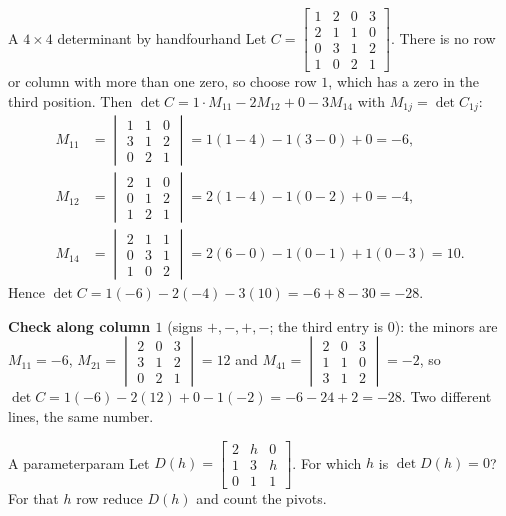 \documentclass[11pt]{article}
\begin{document}
\begin{exmp}{A $4\times4$ determinant by hand}{fourhand}
Let $C=\begin{bmatrix}1&2&0&3\\2&1&1&0\\0&3&1&2\\1&0&2&1\end{bmatrix}$. There is no row or column with more than one zero, so choose row $1$, which has a zero in the third position. Then $\det C=1\cdot M_{11}-2M_{12}+0-3M_{14}$ with $M_{1j}=\det C_{1j}$:
\begin{align*}
M_{11}&=\begin{vmatrix}1&1&0\\3&1&2\\0&2&1\end{vmatrix}=1(1-4)-1(3-0)+0=-6,\\
M_{12}&=\begin{vmatrix}2&1&0\\0&1&2\\1&2&1\end{vmatrix}=2(1-4)-1(0-2)+0=-4,\\
M_{14}&=\begin{vmatrix}2&1&1\\0&3&1\\1&0&2\end{vmatrix}=2(6-0)-1(0-1)+1(0-3)=10.
\end{align*}
Hence $\det C=1(-6)-2(-4)-3(10)=-6+8-30=-28$.

\textbf{Check along column $1$} (signs $+,-,+,-$; the third entry is $0$): the minors are $M_{11}=-6$, $M_{21}=\begin{vmatrix}2&0&3\\3&1&2\\0&2&1\end{vmatrix}=12$ and $M_{41}=\begin{vmatrix}2&0&3\\1&1&0\\3&1&2\end{vmatrix}=-2$, so $\det C=1(-6)-2(12)+0-1(-2)=-6-24+2=-28$. Two different lines, the same number.
\end{exmp}

\begin{kc}{A parameter}{param}
Let $D(h)=\begin{bmatrix}2&h&0\\1&3&h\\0&1&1\end{bmatrix}$. For which $h$ is $\det D(h)=0$? For that $h$ row reduce $D(h)$ and count the pivots.
\end{kc}
\end{document}
